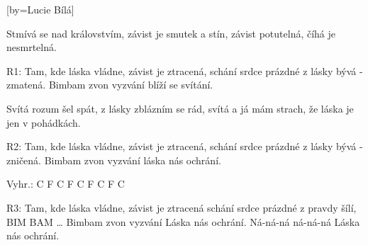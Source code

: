[by={Lucie Bílá}]

\beginverse{}
Stmívá se nad královstvím, závist je smutek a stín, 
závist potutelná, číhá je nesmrtelná.
\endverse{}

\beginverse{}
R1: Tam, kde láska vládne, závist je ztracená,
schání srdce prázdné z lásky bývá - zmatená.
Bimbam zvon vyzvání blíží se svítání.
\endverse{}

\beginverse{}
Svítá rozum šel spát, z lásky zblázním se rád,
svítá a já mám strach, že láska je jen v pohádkách.
\endverse{}

\beginverse{}
R2: Tam, kde láska vládne, závist je ztracená,
schání srdce prázdné z lásky bývá - zničená.
Bimbam zvon vyzvání láska nás ochrání.
\endverse{}

\beginverse{}
Vyhr.: C F C F C F C F C
\endverse{}

\beginverse{}
R3: Tam, kde láska vládne, závist je ztracená
schání srdce prázdné z pravdy šílí, BIM BAM \ldots{}
Bimbam zvon vyzvání Láska nás ochrání.
Ná-ná-ná ná-ná-ná Láska nás ochrání.
\endverse{}

\endsong{}
